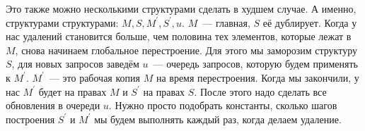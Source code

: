 Это также можно несколькими структурами сделать в худшем случае. А именно, структурами структурами: $M, S, M^\prime, S^\prime, u$. $M$~--- главная, $S$ её дублирует. Когда у нас удалений становится больше, чем половина тех элементов, которые лежат в $M$, снова начинаем глобальное перестроение. Для этого мы заморозим структуру $S$, для новых запросов заведём $u$~--- очередь запросов, которую будем применять к $M^\prime$. $M^\prime$~--- это рабочая копия $M$ на время перестроения. Когда мы закончили, у нас $M^\prime$ будет на правах $M$ и $S^\prime$ на правах $S$. После этого надо сделать все обновления в очереди $u$. Нужно просто подобрать константы, сколько шагов построения $S^\prime$ и $M^\prime$ мы будем выполнять каждый раз, когда делаем удаление.
